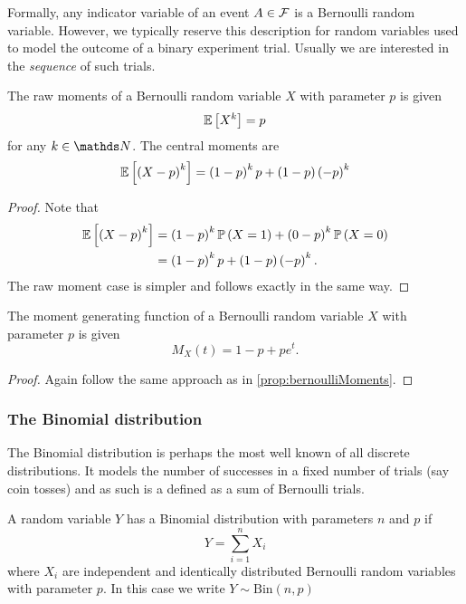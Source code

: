 Formally, any indicator variable of an event $A\in\mathcal{F}$ is a Bernoulli
random variable. However, we typically reserve this description for
random variables used to model the outcome of a binary experiment
trial. Usually we are interested in the \emph{sequence }of such trials.
\begin{prop}
\label{prop:bernoulliMoments}The raw moments of a Bernoulli random
variable $X$ with parameter $p$ is given 
\[
\mathbb{E}\left[X^{k}\right]=p
\]
for any $k\in\N$. The central moments are
\[
\mathbb{E}\left[\left(X-p\right)^{k}\right]=\left(1-p\right)^{k}p+\left(1-p\right)\left(-p\right)^{k}
\]
\end{prop}

\begin{proof}
Note that 
\begin{align*}
\mathbb{E}\left[\left(X-p\right)^{k}\right] & =\left(1-p\right)^{k}\mathbb{P}\left(X=1\right)+\left(0-p\right)^{k}\mathbb{P}\left(X=0\right)\\
 & =\left(1-p\right)^{k}p+\left(1-p\right)\left(-p\right)^{k}.
\end{align*}
The raw moment case is simpler and follows exactly in the same way.
\end{proof}
\begin{prop}
\label{prop:mgfBernoulli}The moment generating function of a Bernoulli
random variable $X$ with parameter $p$ is given
\[
M_{X}\left(t\right)=1-p+pe^{t}.
\]
\end{prop}

\begin{proof}
Again follow the same approach as in \ref{prop:bernoulliMoments}.
\end{proof}

\subsubsection{The Binomial distribution\label{subsec:binomialDistribution}}

The Binomial distribution is perhaps the most well known of all discrete
distributions. It models the number of successes in a fixed number
of trials (say coin tosses) and as such is a defined as a sum of Bernoulli
trials.
\begin{defn}
\label{def:binomialDistribution}A random variable $Y$ has a Binomial
distribution with parameters $n$ and $p$ if 
\[
Y=\sum_{i=1}^{n}X_{i}
\]
where $X_{i}$ are independent and identically distributed Bernoulli
random variables with parameter $p$. In this case we write $Y\sim\textrm{Bin}\left(n,p\right)$
\end{defn}

